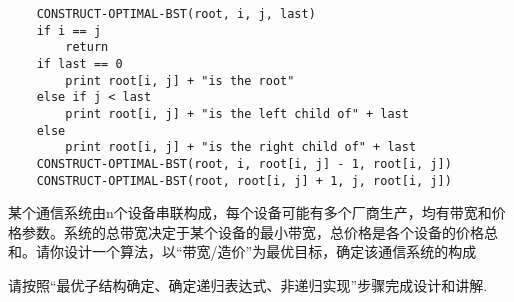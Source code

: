 \documentclass[a4paper, justified]{tufte-handout}
\begin{document}
\begin{problem}[TC 15.5-1]
\end{problem}

\begin{solution}
  \begin{verbatim}
    CONSTRUCT-OPTIMAL-BST(root, i, j, last)
    if i == j
        return
    if last == 0
        print root[i, j] + "is the root"
    else if j < last
        print root[i, j] + "is the left child of" + last
    else
        print root[i, j] + "is the right child of" + last
    CONSTRUCT-OPTIMAL-BST(root, i, root[i, j] - 1, root[i, j])
    CONSTRUCT-OPTIMAL-BST(root, root[i, j] + 1, j, root[i, j])

  \end{verbatim}
\end{solution}

\beginoptional

\begin{problem}
\end{problem}

\begin{solution}
\end{solution}

\beginot
\begin{ot}[通信系统]
  某个通信系统由n个设备串联构成，每个设备可能有多个厂商生产，均有带宽和价格参数。系统的总带宽决定于某个设备的最小带宽，总价格是各个设备的价格总和。请你设计一个算法，以``带宽/造价''为最优目标，确定该通信系统的构成

  请按照``最优子结构确定、确定递归表达式、非递归实现''步骤完成设计和讲解.
\end{ot}


\begin{ot}
\end{ot}



% 
\end{document}
